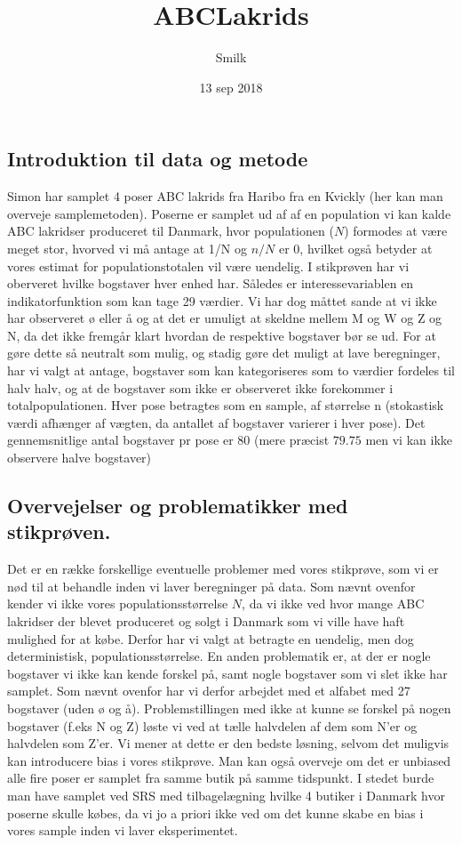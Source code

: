 \documentclass[]{article}
\title{ABCLakrids}
\author{Smilk}
\date{13 sep 2018}
\begin{document}
\maketitle

\subsection{Introduktion til data og
metode}\label{introduktion-til-data-og-metode}

Simon har samplet 4 poser ABC lakrids fra Haribo fra en Kvickly (her kan
man overveje samplemetoden). Poserne er samplet ud af af en population
vi kan kalde ABC lakridser produceret til Danmark, hvor populationen
(\(N\)) formodes at være meget stor, hvorved vi må antage at 1/N og
\(n/N\) er \(0\), hvilket også betyder at vores estimat for
populationstotalen vil være uendelig. I stikprøven har vi oberveret
hvilke bogstaver hver enhed har. Således er interessevariablen en
indikatorfunktion som kan tage 29 værdier. Vi har dog måttet sande at vi
ikke har observeret ø eller å og at det er umuligt at skeldne mellem M
og W og Z og N, da det ikke fremgår klart hvordan de respektive
bogstaver bør se ud. For at gøre dette så neutralt som mulig, og stadig
gøre det muligt at lave beregninger, har vi valgt at antage, bogstaver
som kan kategoriseres som to værdier fordeles til halv halv, og at de
bogstaver som ikke er observeret ikke forekommer i totalpopulationen.
Hver pose betragtes som en sample, af størrelse n (stokastisk værdi
afhænger af vægten, da antallet af bogstaver varierer i hver pose). Det
gennemsnitlige antal bogstaver pr pose er 80 (mere præcist \(79.75\) men
vi kan ikke observere halve bogstaver)

\subsection{Overvejelser og problematikker med
stikprøven.}\label{overvejelser-og-problematikker-med-stikprven.}

Det er en række forskellige eventuelle problemer med vores stikprøve,
som vi er nød til at behandle inden vi laver beregninger på data. Som
nævnt ovenfor kender vi ikke vores populationsstørrelse \(N\), da vi
ikke ved hvor mange ABC lakridser der blevet produceret og solgt i
Danmark som vi ville have haft mulighed for at købe. Derfor har vi valgt
at betragte en uendelig, men dog deterministisk, populationsstørrelse.
En anden problematik er, at der er nogle bogstaver vi ikke kan kende
forskel på, samt nogle bogstaver som vi slet ikke har samplet. Som nævnt
ovenfor har vi derfor arbejdet med et alfabet med 27 bogstaver (uden ø
og å). Problemstillingen med ikke at kunne se forskel på nogen bogstaver
(f.eks N og Z) løste vi ved at tælle halvdelen af dem som N'er og
halvdelen som Z'er. Vi mener at dette er den bedste løsning, selvom det
muligvis kan introducere bias i vores stikprøve. Man kan også overveje
om det er unbiased alle fire poser er samplet fra samme butik på samme
tidspunkt. I stedet burde man have samplet ved SRS med tilbagelægning
hvilke 4 butiker i Danmark hvor poserne skulle købes, da vi jo a priori
ikke ved om det kunne skabe en bias i vores sample inden vi laver
eksperimentet.
\end{document}
